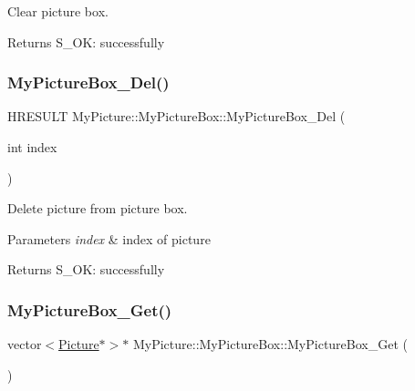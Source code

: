 Clear picture box. 

\begin{DoxyReturn}{Returns}
S\+\_\+\+OK\+: successfully 
\end{DoxyReturn}
\mbox{\label{class_my_picture_1_1_my_picture_box_aa730dae618986f0e6e8b70f108e2cce5}} 
\subsubsection{\texorpdfstring{My\+Picture\+Box\+\_\+\+Del()}{MyPictureBox\_Del()}}
{\footnotesize\ttfamily H\+R\+E\+S\+U\+LT My\+Picture\+::\+My\+Picture\+Box\+::\+My\+Picture\+Box\+\_\+\+Del (\begin{DoxyParamCaption}\item[{int}]{index }\end{DoxyParamCaption})\hspace{0.3cm}{\ttfamily [inline]}}



Delete picture from picture box. 


\begin{DoxyParams}{Parameters}
{\em index} & index of picture \\
\hline
\end{DoxyParams}
\begin{DoxyReturn}{Returns}
S\+\_\+\+OK\+: successfully 
\end{DoxyReturn}
\mbox{\label{class_my_picture_1_1_my_picture_box_a7d5ae6ef186cb635d5a2b34670fd36cf}} 
\subsubsection{\texorpdfstring{My\+Picture\+Box\+\_\+\+Get()}{MyPictureBox\_Get()}}
{\footnotesize\ttfamily vector$<$\hyperlink{class_my_picture_1_1_picture}{Picture}$\ast$$>$$\ast$ My\+Picture\+::\+My\+Picture\+Box\+::\+My\+Picture\+Box\+\_\+\+Get (\begin{DoxyParamCaption}{ }\end{DoxyParamCaption})\hspace{0.3cm}{\ttfamily [inline]}}



